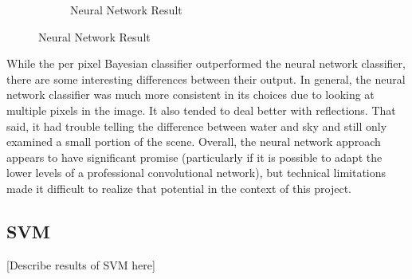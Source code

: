 \documentclass[12pt]{article}
\begin{document}
\begin{figure}
\begin{subfigure}{.33\textwidth}
  \caption{Neural Network Result}
\end{subfigure}%

\end{figure}

	While the per pixel Bayesian classifier outperformed the neural network classifier, there are some interesting differences between their output.  In general, the neural network classifier was much more consistent in its choices due to looking at multiple pixels in the image.  It also tended to deal better with reflections.  That said, it had trouble telling the difference between water and sky and still only examined a small portion of the scene.  Overall, the neural network approach appears to have significant promise (particularly if it is possible to adapt the lower levels of a professional convolutional network), but technical limitations made it difficult to realize that potential in the context of this project.

	\subsection{SVM}
	[Describe results of SVM here]
	
\end{document}
